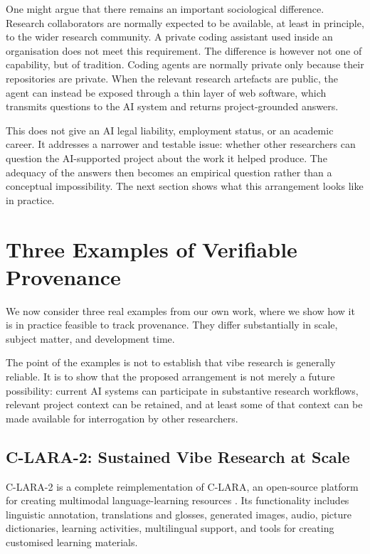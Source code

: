 \documentclass[12pt]{article}
\begin{document}
One might argue that there remains an important sociological difference. Research collaborators are normally expected to be available, at least in principle, to the wider research community. A private coding assistant used inside an organisation does not meet this requirement. The difference is however not one of capability, but of tradition. Coding agents are normally private only because their repositories are private. When the relevant research artefacts are public, the agent can instead be exposed through a thin layer of web software, which transmits questions to the AI system and returns project-grounded answers.

This does not give an AI legal liability, employment status, or an academic career. It addresses a narrower and testable issue: whether other researchers can question the AI-supported project about the work it helped produce.
The adequacy of the answers then becomes an empirical question rather than a conceptual impossibility. The next section shows what this arrangement looks like in practice.


\section{Three Examples of Verifiable Provenance}

We now consider three real examples from our own work, where we show how it is in practice feasible to track provenance. They differ substantially in scale, subject matter, and development time.

The point of the examples is not to establish that vibe research is generally reliable. It is to show that the proposed arrangement is not merely a future possibility: current AI systems can participate in substantive research workflows, relevant project context can be retained, and at least some of that context can be made available for interrogation by other researchers.

\subsection{C-LARA-2: Sustained Vibe Research at Scale}

C-LARA-2 is a complete reimplementation of C-LARA, an open-source platform for creating multimodal language-learning resources \citep{claraOriginal}. Its functionality includes linguistic annotation, translations and glosses, generated images, audio, picture dictionaries, learning activities, multilingual support, and tools for creating customised learning materials.
\end{document}
